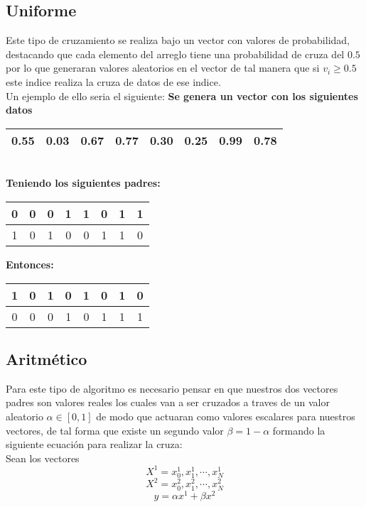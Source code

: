 \documentclass[10pt]{article}
\begin{document}
\subsection{Uniforme}
Este tipo de cruzamiento se realiza bajo un vector con valores de probabilidad, destacando que cada elemento del arreglo tiene una probabilidad de cruza del $0.5$ por lo que generaran valores aleatorios en el vector de tal manera que si $v_{i}\geq 0.5$ este indice realiza la cruza de datos de ese indice.\\Un ejemplo de ello seria el siguiente:
\textbf{Se genera un vector con los siguientes datos}
\begin{center}
  \begin{tabular}{|c|c|c|c|c|c|c|c|}
    \hline
    0.55 & 0.03 & 0.67 & 0.77 & 0.30 & 0.25 & 0.99 & 0.78 \\
    \hline
  \end{tabular}
  \\\vspace{0.25cm}
  \textbf{Teniendo los siguientes padres:}\\
  \begin{tabular}{|c|c|c|c|c|c|c|c|}
    \hline
    \color{blue}0&\color{blue}0&\color{blue}0&\color{blue}1&\color{blue}1&\color{blue}0&\color{blue}1&\color{blue}1\\
    \hline
    \color{red}1&\color{red}0&\color{red}1&\color{red}0&\color{red}0&\color{red}1&\color{red}1&\color{red}0\\
    \hline
  \end{tabular}
  \textbf{Entonces:}
  \begin{tabular}{|c|c|c|c|c|c|c|c|}
    \hline
    \color{red}1 & \color{blue}0 & \color{red}1 & \color{red}0  & \color{blue}1 & \color{blue}0 & \color{red}1&\color{red}0\\
    \hline
    \color{blue}0 & \color{red}0 & \color{blue}0 & \color{blue}1  & \color{red}0 & \color{red}1 & \color{blue}1&\color{blue}1\\
    \hline
  \end{tabular}
\end{center}

\subsection{Aritmético}
Para este tipo de algoritmo es necesario pensar en que nuestros dos vectores padres son valores reales los cuales van a ser cruzados a traves de un valor aleatorio $\alpha\in[0,1]$ de modo que actuaran como valores escalares para nuestros vectores, de tal forma que existe un segundo valor $\beta=1-\alpha$ formando la siguiente ecuación para realizar la cruza:\\\vspace{0.25cm}
Sean los vectores \\
\[\displaystyle X^{1}={x_0^{1},x_1^{1},\cdots,x_N^{1}}\] \[\displaystyle X^{2}={x_0^{2},x_1^{2},\cdots,x_N^{2}}\]
\[y=\alpha x^{1}+\beta x^{2}\]
\end{document}
